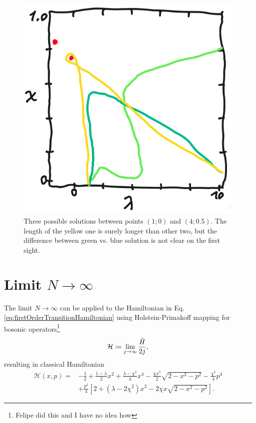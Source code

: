 \begin{figure}[H]
    \centering
    \includegraphics[scale=0.35]{../img/geodesicSolutionsDrawing.png}
    \caption{Three possible solutions between points $(1;0)$ and $(4;0.5)$. The length of the yellow one is surely longer than other two, but the difference between green vs. blue solution is not clear on the first sight.}
    \label{fig:geodesicsBetweenPoints}    
\end{figure}


\newpage
\section{Limit \texorpdfstring{$N\rightarrow \infty$}{N->infty}}
The limit $N\rightarrow \infty$ can be applied to the Hamiltonian in Eq. \ref{eq:firstOrderTransitionHamiltonian} using Holstein-Primakoff mapping for bosonic operators\footnote{Felipe did this and I have no idea how}
\begin{equation}
    \mathcal{H}\coloneqq\lim_{j\rightarrow\infty}\frac{\hat{H}}{2j},
\end{equation}
resulting in classical Hamiltonian
\begin{equation}
    \begin{split}
        \mathcal{H}(x,p)=&-\frac{1}{2}+\frac{1-\lambda}{2}x^2+\frac{\lambda-\chi^2}{4}x^4-\frac{\chi x^3}{2}\sqrt{2-x^2-p^2}-\frac{\chi^2}{4}p^4\\
        &+\frac{p^2}{4}\left[2+(\lambda-2\chi^2)x^2-2\chi x\sqrt{2-x^2-p^2}\right].
    \end{split}
    \label{eq:HamiltonianClassicalLimit}
\end{equation}


